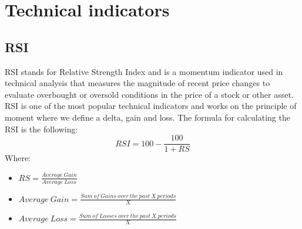 \documentclass{imc-inf}
\begin{document}
	\section{Technical indicators}
		\subsection{RSI}
			RSI stands for Relative Strength Index and is a momentum indicator used in technical analysis that measures the magnitude of recent price changes to
			evaluate overbought or oversold conditions in the price of a stock or other asset. RSI is one of the most popular technical indicators
			and works on the principle of moment where we define a delta, gain and loss. The formula for calculating the RSI is the following:
			\begin{equation}
				RSI = 100 - \frac{100}{1 + RS}
			\end{equation}
			Where:
			\begin{itemize}
				\item $RS = \frac{Average\ Gain}{Average\ Loss}$
				\item $Average\ Gain = \frac{Sum\ of\ Gains\ over\ the\ past\ X\ periods}{X}$
				\item $Average\ Loss = \frac{Sum\ of\ Losses\ over\ the\ past\ X\ periods}{X}$
			\end{itemize}
\end{document}
